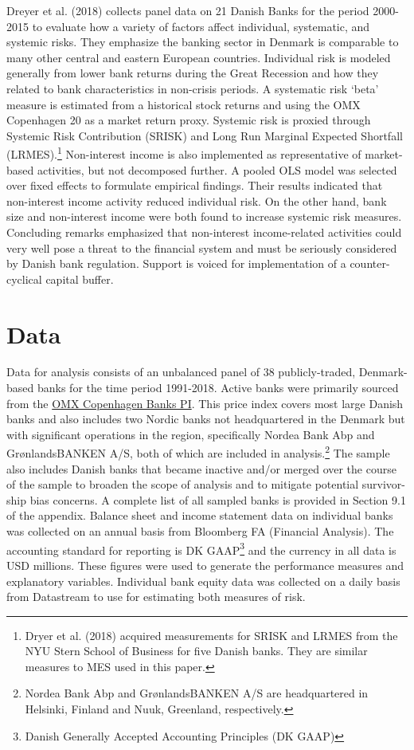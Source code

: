 \documentclass[10pt]{article} %
\begin{document}
Dreyer et al. (2018) collects panel data on 21 Danish Banks for the period 2000-2015 to evaluate how a variety of factors affect individual, systematic, and systemic risks. They emphasize the banking sector in Denmark is comparable to many other central and eastern European countries. Individual risk is modeled generally from lower bank returns during the Great Recession and how they related to bank characteristics in non-crisis periods. A systematic risk `beta' measure is estimated from a historical stock returns and using the OMX Copenhagen 20 as a market return proxy. Systemic risk is proxied through Systemic Risk Contribution (SRISK) and Long Run Marginal Expected Shortfall (LRMES).\footnote{Dryer et al. (2018) acquired measurements for SRISK and LRMES from the NYU Stern School of Business for five  Danish banks. They are similar measures to MES used in this paper.} Non-interest income is also implemented as representative of market-based activities, but not decomposed further. A pooled OLS model was selected over fixed effects to formulate empirical findings. Their results indicated that non-interest income activity reduced individual risk. On the other hand, bank size and non-interest income were both found to increase systemic risk measures. Concluding remarks emphasized that non-interest income-related activities could very well pose a threat to the financial system and must be seriously considered by Danish bank regulation. Support is voiced for implementation of a counter-cyclical capital buffer. 

  
\section{Data}
\par Data for analysis consists of an unbalanced panel of 38 publicly-traded, Denmark-based banks for the time period 1991-2018. Active banks were primarily sourced from the \href{https://www.investing.com/indices/omx-copenhagen-banks-pi-components}{OMX Copenhagen Banks PI}. This price index covers most large Danish banks and also includes two Nordic banks not headquartered in the Denmark but with significant operations in the region, specifically Nordea Bank Abp and Gr\o nlandsBANKEN A/S, both of which are included in analysis.\footnote{Nordea Bank Abp and Gr\o nlandsBANKEN A/S are headquartered in Helsinki, Finland and Nuuk, Greenland, respectively.} The sample also includes Danish banks that became inactive and/or merged over the course of the sample to broaden the scope of analysis and to mitigate potential survivor-ship bias concerns. A complete list of all sampled banks is provided in Section 9.1 of the appendix. Balance sheet and income statement data on individual banks was collected on an annual basis from Bloomberg FA (Financial Analysis). The accounting standard for reporting is DK GAAP\footnote{Danish Generally Accepted Accounting Principles (DK GAAP)} and the currency in all data is USD millions. These figures were used to generate the performance measures and explanatory variables. Individual bank equity data was collected on a daily basis from Datastream to use for estimating both measures of risk.  
\end{document}
